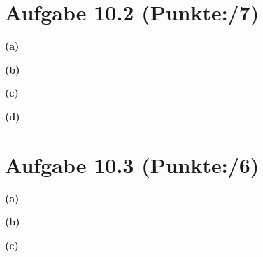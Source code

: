 \documentclass[11pt, a4paper]{article}
\newcommand{\blattnummer}{10}
\newcommand{\pp}{7}
\newcommand{\ppp}{6}
\newcommand{\aufgabe}[2] {\section*{Aufgabe \blattnummer.#1 (Punkte:\qquad/#2)}}
\newcommand{\aufgabenteil}[1] {\textbf{(#1)}}
\begin{document}
\aufgabe{2}{\pp}
\aufgabenteil{a}
\begin{adjustwidth}{20pt}{20pt}

\end{adjustwidth}
\aufgabenteil{b}
\begin{adjustwidth}{20pt}{20pt}

\end{adjustwidth}
\aufgabenteil{c}
\begin{adjustwidth}{20pt}{20pt}

\end{adjustwidth}
\aufgabenteil{d}
\begin{adjustwidth}{20pt}{20pt}

\end{adjustwidth}



\aufgabe{3}{\ppp}
\aufgabenteil{a}
\begin{adjustwidth}{20pt}{20pt}

\end{adjustwidth}
\aufgabenteil{b}
\begin{adjustwidth}{20pt}{20pt}

\end{adjustwidth}
\aufgabenteil{c}
\begin{adjustwidth}{20pt}{20pt}

\end{adjustwidth}

\end{document}
